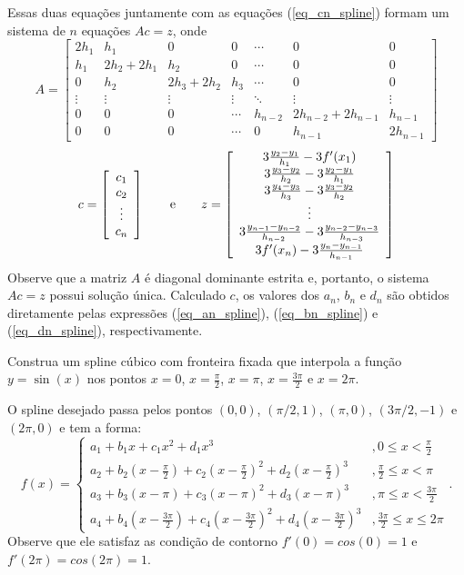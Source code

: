 Essas duas equações juntamente com as equações (\ref{eq_cn_spline}) formam um sistema de $n$ equações $Ac = z$, onde
\begin{equation*}
A=\left[\begin{array}{ccccccc}
2h_1 &h_1&0&0 &\cdots&0&0\\
h_1&2h_2+2h_{1}&h_2&0&\cdots&0&0\\
0&h_2&2h_3+2h_{2}&h_3&\cdots&0&0\\
\vdots&\vdots&\vdots&\vdots&\ddots&\vdots&\vdots\\
0&0&0&\cdots&h_{n-2} & 2h_{n-2}+2h_{n-1}&h_{n-1}\\
0&0&0&\cdots &0&h_{n-1}&2h_{n-1}
\end{array}\right]  
\end{equation*}  
\begin{equation*}
c = \left[\begin{array}{c}
c_1\\
c_2\\
\vdots\\
c_n
\end{array}\right]\qquad \hbox{e}\qquad
z = \left[\begin{array}{c}
3\frac{y_{2}-y_1}{h_1}-3f'(x_1)\\
3\frac{y_{3}-y_2}{h_2}-3\frac{y_{2}-y_{1}}{h_{1}}\\
3\frac{y_{4}-y_3}{h_3}-3\frac{y_{3}-y_{2}}{h_{2}}\\
\vdots\\
3\frac{y_{n-1}-y_{n-2}}{h_{n-2}}-3\frac{y_{n-2}-y_{n-3}}{h_{n-3}}\\
3f'(x_n)-3\frac{y_{n}-y_{n-1}}{h_{n-1}}
\end{array}\right]  
\end{equation*}
Observe que a matriz $A$ é diagonal dominante estrita e, portanto, o sistema $Ac = z$ possui solução única. Calculado $c$, os valores dos $a_n$, $b_n$ e $d_n$ são obtidos diretamente pelas expressões (\ref{eq_an_spline}), (\ref{eq_bn_spline}) e (\ref{eq_dn_spline}), respectivamente.


\begin{ex}Construa um spline cúbico com fronteira fixada que interpola a função $y=\sin (x)$ nos pontos $x=0$, $x=\frac{\pi}{2}$, $x=\pi$, $x=\frac{3\pi}{2}$ e $x=2\pi$.
\end{ex}
O spline desejado passa pelos pontos $(0,0)$, $(\pi/2,1)$, $(\pi,0)$, $(3\pi/2,-1)$ e $(2\pi,0)$ e tem a forma:
\begin{equation*}
f(x)=\left\{\begin{array}{ll}
a_1+b_1x+c_1x^2+d_1x^3&, 0\leq x<\frac{\pi}{2}\\
a_2+b_2(x-\frac{\pi}{2})+c_2(x-\frac{\pi}{2})^2+d_2(x-\frac{\pi}{2})^3&, \frac{\pi}{2}\leq x<\pi\\
a_3+b_3(x-\pi)+c_3(x-\pi)^2+d_3(x-\pi)^3&, \pi\leq x<\frac{3\pi}{2}\\
a_4+b_4(x-\frac{3\pi}{2})+c_4(x-\frac{3\pi}{2})^2+d_4(x-\frac{3\pi}{2})^3&, \frac{3\pi}{2}\leq x\leq 2\pi
\end{array}\right..  
\end{equation*}
Observe que ele satisfaz as condição de contorno $f'(0)=cos(0)=1$ e $f'(2\pi)=cos(2\pi)=1$.


